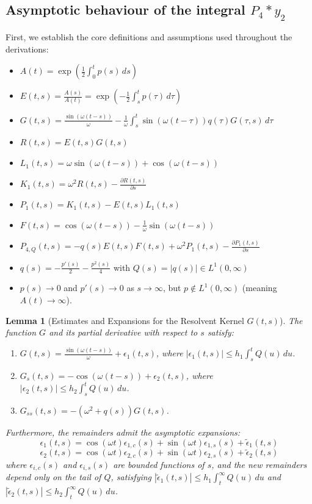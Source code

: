 \documentclass[10pt,reqno]{amsart}
\newtheorem{lemma}[theorem]{Lemma}
\theoremstyle{definition}
\begin{document}
	\subsection{Asymptotic behaviour of the integral $P_4\ast y_2$}
	First, we establish the core definitions and assumptions used throughout the derivations:
	\begin{itemize}
		\item $A(t) = \exp\left(\frac{1}{2}\int_0^t p(s)\,ds\right)$
		\item $E(t,s) = \frac{A(s)}{A(t)} = \exp\left(-\frac{1}{2}\int_s^t p(\tau)\,d\tau\right)$
		\item $G(t, s) = \frac{\sin(\omega(t-s))}{\omega} - \frac{1}{\omega} \int_s^t \sin(\omega(t-\tau)) q(\tau) G(\tau, s) \, d\tau$
		\item $R(t,s) = E(t,s)G(t,s)$
		\item $L_1(t,s) = \omega \sin(\omega(t-s)) + \cos(\omega(t-s))$
		\item $K_1(t,s) = \omega^2 R(t,s) - \frac{\partial R(t,s)}{\partial s}$
		\item $P_1(t,s) = K_1(t,s) - E(t,s)L_1(t,s)$
		\item $F(t, s) = \cos(\omega(t-s)) - \frac{1}{\omega} \sin(\omega(t-s))$
		\item $P_{4,Q}(t,s) = -q(s)E(t,s)F(t,s) + \omega^2 P_1(t,s) - \frac{\partial P_1(t,s)}{\partial s}$
		\item $q(s) = -\frac{p'(s)}{2} - \frac{p^2(s)}{4}$ with $Q(s) = |q(s)| \in L^1(0, \infty)$
		\item $p(s) \to 0$ and $p'(s) \to 0$ as $s \to \infty$, but $p \notin L^1(0, \infty)$ (meaning $A(t) \to \infty$).
	\end{itemize}
	
	\vspace{0.5cm}
	
	\begin{lemma}[Estimates and Expansions for the Resolvent Kernel $G(t,s)$]
		The function $G$ and its partial derivative with respect to $s$ satisfy:
		\begin{enumerate}
			\item $G(t,s) = \frac{\sin(\omega(t-s))}{\omega} + \epsilon_1(t,s)$, where $|\epsilon_1(t,s)| \leq h_1\int_s^t Q(u)\,du$.
			\item $G_s(t,s) = -\cos(\omega(t-s)) + \epsilon_2(t,s)$, where $|\epsilon_2(t,s)| \leq h_2\int_s^t Q(u)\,du$.
			\item $G_{ss}(t,s) = -(\omega^2 + q(s))G(t,s)$.
		\end{enumerate}
		Furthermore, the remainders admit the asymptotic expansions:
		\[ \epsilon_1(t,s) = \cos(\omega t)\epsilon_{1,c}(s) + \sin(\omega t)\epsilon_{1,s}(s) + \tilde{\epsilon}_1(t,s) \]
		\[ \epsilon_2(t,s) = \cos(\omega t)\epsilon_{2,c}(s) + \sin(\omega t)\epsilon_{2,s}(s) + \tilde{\epsilon}_2(t,s) \]
		where $\epsilon_{i,c}(s)$ and $\epsilon_{i,s}(s)$ are bounded functions of $s$, and the new remainders depend only on the tail of $Q$, satisfying $|\tilde{\epsilon}_1(t,s)| \leq h_1 \int_t^\infty Q(u)\,du$ and $|\tilde{\epsilon}_2(t,s)| \leq h_2 \int_t^\infty Q(u)\,du$.
	\end{lemma}
	
\end{document}
